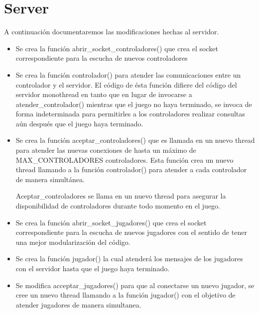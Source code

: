 \documentclass[a4paper,10pt,twoside]{article}
\begin{document}


\section{Server}

A continuación documentaremos las modificaciones hechas al servidor.

\begin{itemize}
    \item Se crea la función abrir\_socket\_controladores() que crea el socket correspondiente para la escucha de nuevos controladores
    
    \item Se crea la función controlador() para atender las comunicaciones entre un controlador y el servidor. El código de ésta función difiere del código del servidor monothread en tanto que en lugar de invocarse a atender\_controlador() mientras que el juego no haya terminado, se invoca de forma indeterminada para permitirles a los controladores realizar consultas aún después que el juego haya terminado.
    
    \item Se crea la función aceptar\_controladores() que es llamada en un nuevo thread para atender las nuevas conexiones de hasta un máximo de MAX\_CONTROLADORES controladores. Esta función crea un nuevo thread llamando a la función controlador() para atender a cada controlador de manera simultánea.

    Aceptar\_controladores  se llama en un nuevo thread para asegurar la disponibilidad de controladores durante todo momento en el juego.
    
    \item Se crea la función abrir\_socket\_jugadores() que crea el socket correspondiente para la escucha de nuevos jugadores con el sentido de tener una mejor modularización del código.
    
    \item Se crea la función jugador() la cual atenderá los mensajes de los jugadores con el servidor hasta que el juego haya terminado.
    
    \item Se modifica acceptar\_jugadores() para que al conectarse un nuevo jugador, se cree un nuevo thread llamando a la función jugador() con el objetivo de atender jugadores de manera simultanea.
    

\end{itemize}
\end{document}
